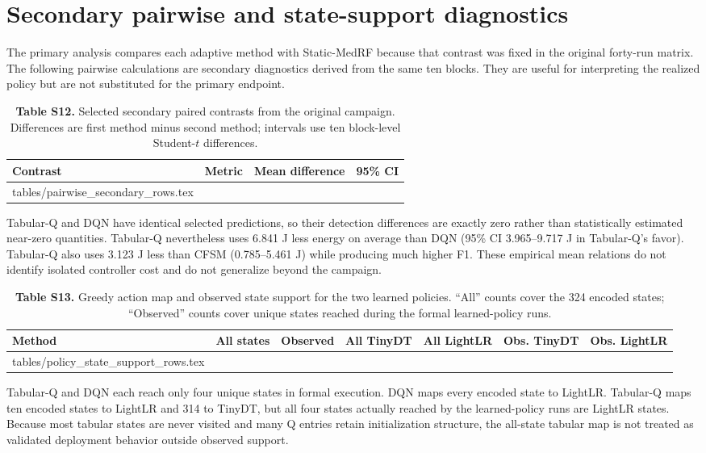 \documentclass[10pt,a4paper]{article}
\makeatletter
\newcommand{\tableinput}[1]{\@@input #1.tex }
\makeatother
\begin{document}
\clearpage
\section{Secondary pairwise and state-support diagnostics}
The primary analysis compares each adaptive method with Static-MedRF because that contrast was fixed in the original forty-run matrix. The following pairwise calculations are secondary diagnostics derived from the same ten blocks. They are useful for interpreting the realized policy but are not substituted for the primary endpoint.

\begin{table}[h!]
\centering\small
\caption*{\textbf{Table S12.} Selected secondary paired contrasts from the original campaign. Differences are first method minus second method; intervals use ten block-level Student-$t$ differences.}
\begin{tabular}{llrr}\toprule
Contrast & Metric & Mean difference & 95\% CI\\\midrule
\tableinput{tables/pairwise_secondary_rows}
\bottomrule\end{tabular}
\end{table}

Tabular-Q and DQN have identical selected predictions, so their detection differences are exactly zero rather than statistically estimated near-zero quantities. Tabular-Q nevertheless uses 6.841 J less energy on average than DQN (95\% CI 3.965--9.717 J in Tabular-Q's favor). Tabular-Q also uses 3.123 J less than CFSM (0.785--5.461 J) while producing much higher F1. These empirical mean relations do not identify isolated controller cost and do not generalize beyond the campaign.

\begin{table}[h!]
\centering\small
\caption*{\textbf{Table S13.} Greedy action map and observed state support for the two learned policies. ``All'' counts cover the 324 encoded states; ``Observed'' counts cover unique states reached during the formal learned-policy runs.}
\begin{tabular}{lrrrrrr}\toprule
Method & All states & Observed & All TinyDT & All LightLR & Obs. TinyDT & Obs. LightLR\\\midrule
\tableinput{tables/policy_state_support_rows}
\bottomrule\end{tabular}
\end{table}

Tabular-Q and DQN each reach only four unique states in formal execution. DQN maps every encoded state to LightLR. Tabular-Q maps ten encoded states to LightLR and 314 to TinyDT, but all four states actually reached by the learned-policy runs are LightLR states. Because most tabular states are never visited and many Q entries retain initialization structure, the all-state tabular map is not treated as validated deployment behavior outside observed support.
\end{document}
